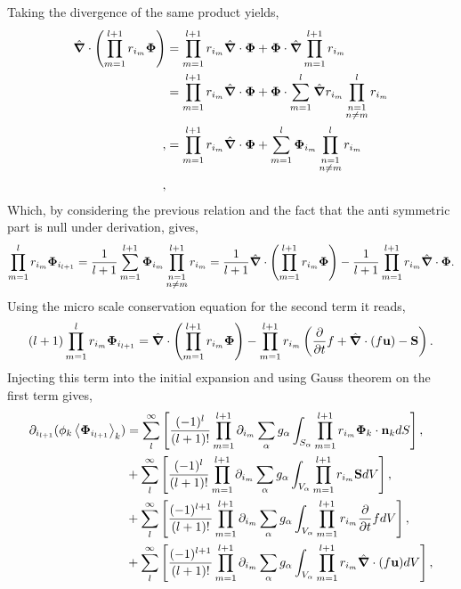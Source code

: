 Taking the divergence of the same product yields, 
\begin{align*}
    \hat{\bm{\nabla}} \cdot \left(\prod^{l+1}_{m=1} r_{i_m} \bm{\Phi}\right)
    &= \prod^{l+1}_{m=1} r_{i_m} \hat{\bm{\nabla}} \cdot \bm{\Phi}
    + \bm{\Phi} \cdot \hat{\bm{\nabla}} \prod^{l+1}_{m=1} r_{i_m}\\
    &= \prod^{l+1}_{m=1} r_{i_m} \hat{\bm{\nabla}} \cdot \bm{\Phi}
    + \bm{\Phi}  \cdot\sum_{m=1}^l \hat{\bm{\nabla}} r_{i_m}  \prod^{l}_{\substack{n=1 \\ n \neq m}} r_{i_m}\\,
    &= \prod^{l+1}_{m=1} r_{i_m} \hat{\bm{\nabla}} \cdot \bm{\Phi}
    + \sum_{m=1}^l \bm{\Phi}_{i_m}  \prod^{l}_{\substack{n=1 \\ n \neq m}} r_{i_m}\\,
\end{align*}
Which, by considering the previous relation and the fact that the anti symmetric part is null under derivation, gives, 
\begin{equation}
    \prod^{l}_{m=1} r_{i_m} \bm{\Phi}_{i_{l+1}}
    =\frac{1}{l+1}\sum_{m=1}^{l+1} \bm{\Phi}_{i_m}  \prod^{l+1}_{\substack{n=1 \\ n \neq m}} r_{i_m}
    =\frac{1}{l+1}\hat{\bm{\nabla}}\cdot \left(\prod^{l+1}_{m=1} r_{i_m} \bm{\Phi}\right)
    - \frac{1}{l+1}\prod^{l+1}_{m=1} r_{i_m} \hat{\bm{\nabla}}\cdot \bm{\Phi}.
\end{equation}
Using the micro scale conservation equation for the second term it reads, 
\begin{equation}
    (l+1) \prod^{l}_{m=1} r_{i_m} \bm{\Phi}_{i_{l+1}}
    =\hat{\bm{\nabla}} \cdot \left(\prod^{l+1}_{m=1} r_{i_m} \bm{\Phi}\right)
    - \prod^{l+1}_{m=1} r_{i_m} \left(
        \frac{\partial}{\partial t} f 
        + \hat{\bm{\nabla}} \cdot (f \textbf{u})
        - \textbf{S}
    \right).
\end{equation}
Injecting this term into the initial expansion and using Gauss theorem on the first term gives,
\begin{align*}
    \partial_{i_{l+1}}
    (\phi_k \left<\bm{\Phi}_{i_{l+1}}\right>_k)
    & =\sum_l^\infty
    \left[
        \frac{(-1)^{l}}{(l+1)!}
        \prod^{l+1}_{m=1}
        \partial_{i_m}
        \sum_{\alpha}
        g_{\alpha}
        \int_{S_\alpha}
        \prod^{l+1}_{m=1}
        r_{i_m} \bm{\Phi}_k \cdot \textbf{n}_k dS
    \right],\\
    & +\sum_l^\infty
    \left[
        \frac{(-1)^{l}}{(l+1)!}
        \prod^{l+1}_{m=1}
        \partial_{i_m}
        \sum_{\alpha}
        g_{\alpha}
        \int_{V_\alpha}
        \prod^{l+1}_{m=1}
        r_{i_m} \textbf{S} dV
    \right],\\
    & +\sum_l^\infty
    \left[
        \frac{(-1)^{l+1}}{(l+1)!}
        \prod^{l+1}_{m=1}
        \partial_{i_m}
        \sum_{\alpha}
        g_{\alpha}
        \int_{V_\alpha}
        \prod^{l+1}_{m=1}
        r_{i_m} \frac{\partial}{\partial t} f dV
    \right],\\
    & +\sum_l^\infty
    \left[
        \frac{(-1)^{l+1}}{(l+1)!}
        \prod^{l+1}_{m=1}
        \partial_{i_m}
        \sum_{\alpha}
        g_{\alpha}
        \int_{V_\alpha}
        \prod^{l+1}_{m=1}
        r_{i_m} \hat{\bm{\nabla}} \cdot (f \textbf{u}) dV
    \right],\\
\end{align*}
